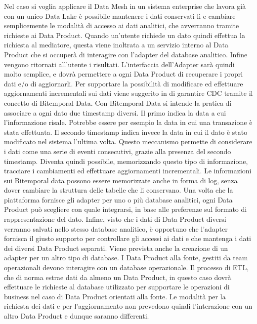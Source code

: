 \documentclass[12pt]{report}
\begin{document}
Nel caso si voglia applicare il Data Mesh in un sistema enterprise che lavora già con un unico Data Lake è possibile mantenere i dati conservati lì e cambiare semplicemente le modalità di accesso ai dati analitici, che avverranno tramite richieste ai Data Product.
Quando un'utente richiede un dato quindi effettua la richiesta al mediatore, questa viene inoltrata a un servizio interno al Data Product che si occuperà di interagire con l'adapter del database analitico. 
Infine vengono ritornati all'utente i risultati.
L'interfaccia dell'Adapter sarà quindi molto semplice, e dovrà permettere a ogni Data Product di recuperare i propri dati e/o di aggiornarli.
Per supportare la possibilità di modificare ed effettuare aggiornamenti incrementali sui dati viene suggerito in \cite{zhamak_dehgani_data_2023,fowlerBitemporalNodate}
di garantire CDC tramite il concetto di Bitemporal Data.
Con Bitemporal Data si intende la pratica di associare a ogni dato due timestamp diversi. 
Il primo indica la data a cui l'informazione risale. 
Potrebbe essere per esempio la data in cui una transazione è stata effettuata.
Il secondo timestamp indica invece la data in cui il dato è stato modificato nel sistema l'ultima volta.
Questo meccanismo permette di considerare i dati come una serie di eventi consecutivi, grazie alla presenza del secondo timestamp.
Diventa quindi possibile, memorizzando questo tipo di informazione, tracciare i cambiamenti ed effettuare aggiornamenti incrementali.
Le informazioni sui Bitemporal data possono essere memorizzate anche in forma di log, senza dover cambiare la struttura delle tabelle che li conservano.
Una volta che la piattaforma fornisce gli adapter per uno o più database analitici, ogni Data Product può scegliere con quale integrarsi, in base alle preferenze sul formato di rappresentazione del dato.
Infine, visto che i dati di Data Product diversi verranno salvati nello stesso database analitico, è opportuno che l'adapter fornisca il giusto supporto per controllare gli accessi ai dati e che mantenga i dati dei diversi Data Product separati.
Viene prevista anche la creazione di un adapter per un altro tipo di database.
I Data Product alla fonte, gestiti da team operazionali devono interagire con un database operazionale.
Il processo di ETL, che di norma estrae dati da almeno un Data Product, in questo caso dovrà effettuare le richieste al database utilizzato per supportare le operazioni di business nel caso di Data Product orientati alla fonte.
Le modalità per la richiesta dei dati e per l'aggiornamento non prevedono quindi l'interazione con un altro Data Product e dunque saranno differenti.
\end{document}
